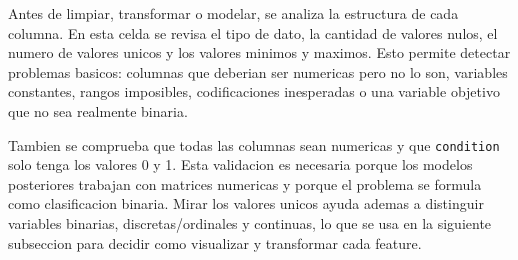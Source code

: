 \documentclass[11pt]{article}
\begin{document}
Antes de limpiar, transformar o modelar, se analiza la estructura de
cada columna. En esta celda se revisa el tipo de dato, la cantidad de
valores nulos, el numero de valores unicos y los valores minimos y
maximos. Esto permite detectar problemas basicos: columnas que deberian
ser numericas pero no lo son, variables constantes, rangos imposibles,
codificaciones inesperadas o una variable objetivo que no sea realmente
binaria.

Tambien se comprueba que todas las columnas sean numericas y que
\texttt{condition} solo tenga los valores 0 y 1. Esta validacion es
necesaria porque los modelos posteriores trabajan con matrices numericas
y porque el problema se formula como clasificacion binaria. Mirar los
valores unicos ayuda ademas a distinguir variables binarias,
discretas/ordinales y continuas, lo que se usa en la siguiente
subseccion para decidir como visualizar y transformar cada feature.
\end{document}

